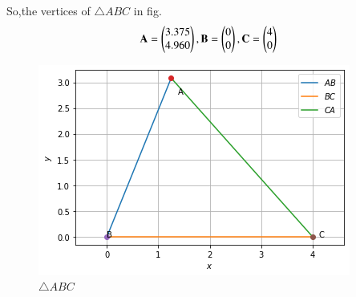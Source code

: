 \documentclass[journal,12pt,twocolumn]{IEEEtran}
\begin{document}
So,the vertices of $\triangle ABC$ in fig. 
\begin{align}
\mathbf{A} = \begin{pmatrix}3.375\\4.960\end{pmatrix}, \mathbf{B} = \begin{pmatrix}0\\0\end{pmatrix}, \mathbf{C} = \begin{pmatrix}4\\0\end{pmatrix}
\end{align}
\begin{figure}[!ht]
\centering
\includegraphics[width=\columnwidth]{diagram.png}
\caption{ $\triangle ABC$}
\label{fig:tri_sss_triangle}	
\end{figure}
\end{document}
